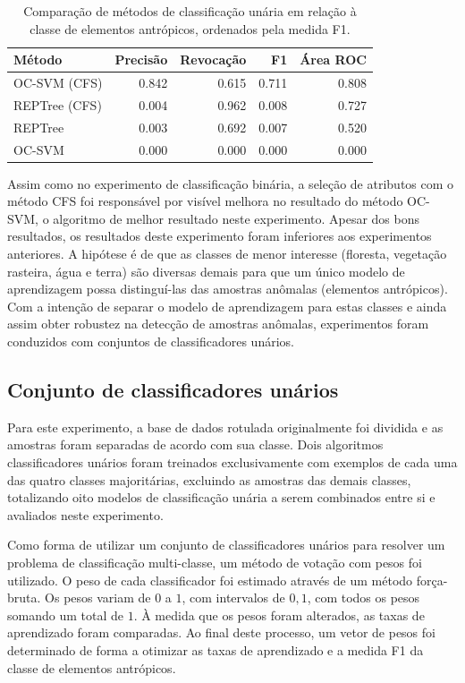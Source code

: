\begin{table}[h]
\centering
\begin{tabulary}{\linewidth}{|L|R|R|R|R|}
\hline
\textbf{Método} & \textbf{Precisão} & \textbf{Revocação} & \textbf{F1} & \textbf{Área ROC} \\ \hline
OC-SVM (CFS)  & 0.842 & 0.615 & 0.711 & 0.808 \\ \hline
REPTree (CFS) & 0.004 & 0.962 & 0.008 & 0.727 \\ \hline
REPTree       & 0.003 & 0.692 & 0.007 & 0.520 \\ \hline
OC-SVM        & 0.000 & 0.000 & 0.000 & 0.000 \\ \hline
\end{tabulary}
\caption{Comparação de métodos de classificação unária em relação à classe de elementos antrópicos, ordenados pela medida F1.}
\label{tab:experimentoUniclasseAntropico}
\end{table}

Assim como no experimento de classificação binária, a seleção de atributos com o método CFS foi responsável por visível melhora no resultado do método OC-SVM, o algoritmo de melhor resultado neste experimento. Apesar dos bons resultados, os resultados deste experimento foram inferiores aos experimentos anteriores. A hipótese é de que as classes de menor interesse (floresta, vegetação rasteira, água e terra) são diversas demais para que um único modelo de aprendizagem possa distinguí-las das amostras anômalas (elementos antrópicos). Com a intenção de separar o modelo de aprendizagem para estas classes e ainda assim obter robustez na detecção de amostras anômalas, experimentos foram conduzidos com conjuntos de classificadores unários.

\subsection{Conjunto de classificadores unários}

Para este experimento, a base de dados rotulada originalmente foi dividida e as amostras foram separadas de acordo com sua classe. Dois algoritmos classificadores unários foram treinados exclusivamente com exemplos de cada uma das quatro classes majoritárias, excluindo as amostras das demais classes, totalizando oito modelos de classificação unária a serem combinados entre si e avaliados neste experimento.

Como forma de utilizar um conjunto de classificadores unários para resolver um problema de classificação multi-classe, um método de votação com pesos foi utilizado. O peso de cada classificador foi estimado através de um método força-bruta. Os pesos variam de $0$ a $1$, com intervalos de $0,1$, com todos os pesos somando um total de $1$. À medida que os pesos foram alterados, as taxas de aprendizado foram comparadas. Ao final deste processo, um vetor de pesos foi determinado de forma a otimizar as taxas de aprendizado e a medida F1 da classe de elementos antrópicos.

